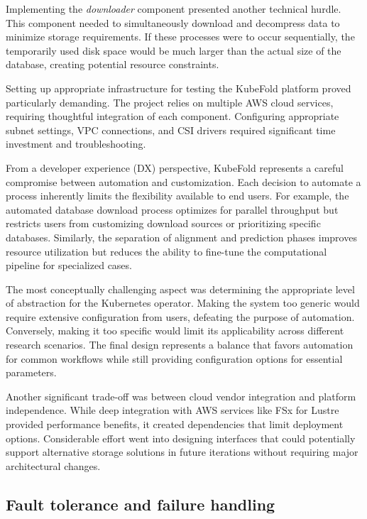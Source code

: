 Implementing the \textit{downloader} component presented another technical hurdle.
This component needed to simultaneously download and decompress data to minimize storage requirements.
If these processes were to occur sequentially, the temporarily used disk space would be much larger than the actual size of the database, creating potential resource constraints.

Setting up appropriate infrastructure for testing the KubeFold platform proved particularly demanding.
The project relies on multiple AWS cloud services, requiring thoughtful integration of each component.
Configuring appropriate subnet settings, VPC connections, and CSI drivers required significant time investment and troubleshooting.

From a developer experience (DX) perspective, KubeFold represents a careful compromise between automation and customization. Each decision to automate a process inherently limits the flexibility available to end users. For example, the automated database download process optimizes for parallel throughput but restricts users from customizing download sources or prioritizing specific databases. Similarly, the separation of alignment and prediction phases improves resource utilization but reduces the ability to fine-tune the computational pipeline for specialized cases.

The most conceptually challenging aspect was determining the appropriate level of abstraction for the Kubernetes operator. Making the system too generic would require extensive configuration from users, defeating the purpose of automation. Conversely, making it too specific would limit its applicability across different research scenarios. The final design represents a balance that favors automation for common workflows while still providing configuration options for essential parameters.

Another significant trade-off was between cloud vendor integration and platform independence. While deep integration with AWS services like FSx for Lustre provided performance benefits, it created dependencies that limit deployment options. Considerable effort went into designing interfaces that could potentially support alternative storage solutions in future iterations without requiring major architectural changes.

\subsection{Fault tolerance and failure handling}

